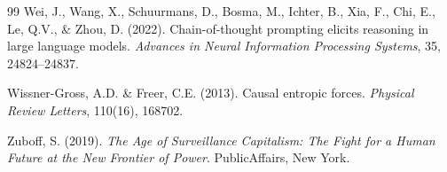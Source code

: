 \documentclass[12pt, oneside]{article}
\begin{document}
\begin{thebibliography}{99}
Wei, J., Wang, X., Schuurmans, D., Bosma, M., Ichter, B., Xia, F., Chi, E., Le, Q.V., \& Zhou, D. (2022). Chain-of-thought prompting elicits reasoning in large language models. \textit{Advances in Neural Information Processing Systems}, 35, 24824--24837.

Wissner-Gross, A.D. \& Freer, C.E. (2013). Causal entropic forces. \textit{Physical Review Letters}, 110(16), 168702.

Zuboff, S. (2019). \textit{The Age of Surveillance Capitalism: The Fight for a Human Future at the New Frontier of Power}. PublicAffairs, New York.

\end{thebibliography}
\end{document}
